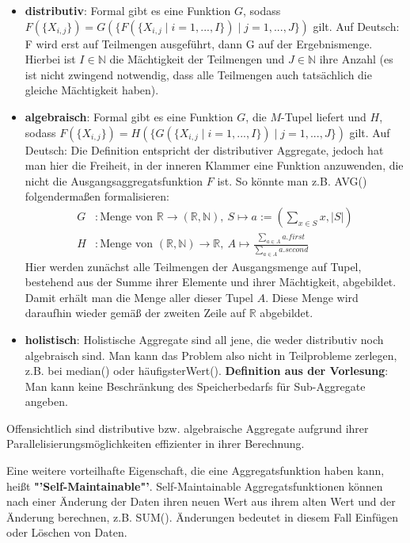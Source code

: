 \begin{itemize}
	\item \textbf{distributiv}: Formal gibt es eine Funktion \(G\), sodass \(F(\{X_{i,j}\}) = G(\{F(\{X_{i,j} \mid i = 1, ..., I\}) \mid j = 1, ..., J\})\) gilt. Auf Deutsch: F wird erst auf Teilmengen ausgeführt, dann G auf der Ergebnismenge. Hierbei ist \(I \in \mathbb{N}\) die Mächtigkeit der Teilmengen und \(J\in\mathbb{N}\) ihre Anzahl (es ist nicht zwingend notwendig, dass alle Teilmengen auch tatsächlich die gleiche Mächtigkeit haben).
	\item \textbf{algebraisch}: Formal gibt es eine Funktion \(G\), die \(M\)-Tupel liefert und \(H\), sodass \(F(\{X_{i,j}\}) = H(\{G(\{X_{i,j} \mid i = 1, ..., I\}) \mid j = 1, ..., J\})\) gilt. Auf Deutsch: Die Definition entspricht der distributiver Aggregate, jedoch hat man hier die Freiheit, in der inneren Klammer eine Funktion anzuwenden, die nicht die Ausgangsaggregatsfunktion \(F\) ist. So könnte man z.B. AVG() folgendermaßen formalisieren:
	\begin{align*}
		G &: \text{Menge von } \mathbb{R} \rightarrow (\mathbb{R},\mathbb{N}),\ S \mapsto a:= (\sum\nolimits_{x\in S} x, \lvert S\rvert) \\
		H &: \text{Menge von } (\mathbb{R},\mathbb{N}) \rightarrow \mathbb{R},\ A \mapsto \frac{\sum\nolimits_{a\in A} a.first}{\sum\nolimits_{a\in A}a.second}
	\end{align*}
    Hier werden zunächst alle Teilmengen der Ausgangsmenge auf Tupel,
    bestehend aus der Summe ihrer Elemente und ihrer Mächtigkeit,
    abgebildet. Damit erhält man die Menge aller dieser Tupel \(A\). Diese
    Menge wird daraufhin wieder gemäß der zweiten Zeile auf \(\mathbb{R}\)
    abgebildet.
	\item \textbf{holistisch}: Holistische Aggregate sind all jene, die weder distributiv noch algebraisch sind. Man kann das Problem also nicht in Teilprobleme zerlegen, z.B. bei median() oder häufigsterWert(). \textbf{Definition aus der Vorlesung}: Man kann keine Beschränkung des Speicherbedarfs für Sub-Aggregate angeben.
\end{itemize}
Offensichtlich sind distributive bzw. algebraische Aggregate aufgrund ihrer Parallelisierungsmöglichkeiten effizienter in ihrer Berechnung.

\noindent Eine weitere vorteilhafte Eigenschaft, die eine Aggregatsfunktion haben kann, heißt \textbf{"'Self-Maintainable"'}. Self-Maintainable Aggregatsfunktionen können nach einer Änderung der Daten ihren neuen Wert aus ihrem alten Wert und der Änderung berechnen, z.B. SUM(). Änderungen bedeutet in diesem Fall Einfügen oder Löschen von Daten.

